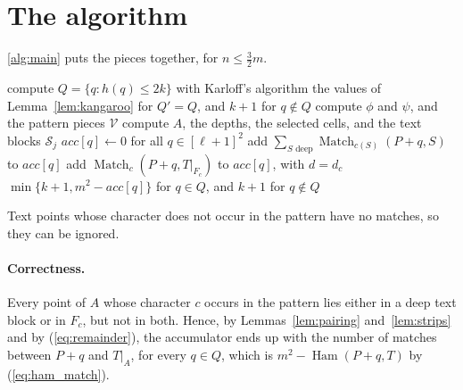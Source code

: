 \documentclass[11pt]{article}
\theoremstyle{definition}
\DeclareMathOperator{\Ham}{Ham}
\DeclareMathOperator{\Match}{Match}
\newcommand{\cS}{\mathcal{S}}
\newcommand{\cV}{\mathcal{V}}
\newcommand{\abs}[1]{\lvert #1 \rvert}
\begin{document}
\section{The algorithm}
\label{sec:algorithm}

\autoref{alg:main} puts the pieces together, for $n \le \frac32 m$.



\begin{algorithm}[ht]
  \caption{Two-dimensional pattern matching with $k$ mismatches, for $n \le \frac32 m$.}
  \label{alg:main}
  \begin{algorithmic}[1]
    \State compute $Q = \{q : h(q) \le 2k\}$ with Karloff's algorithm 
    \If{$\abs{Q} \le 32m + m^2/k$}
      \State \Return the values of Lemma~\ref{lem:kangaroo} for $Q' = Q$, and $k+1$ for $q \notin Q$
    \EndIf
    \State compute $\phi$ and $\psi$, and the pattern pieces $\cV$ 
    \State compute $A$, the depths, the selected cells, and the text blocks $\cS_j$ 
    \State $\mathit{acc}[q] \gets 0$ for all $q \in [\ell+1]^2$
    \State add $\sum_{S \text{ deep}} \Match_{c(S)}(P + q, S)$ to $\mathit{acc}[q]$ 
      \State add $\Match_c(P + q, T|_{F_c})$ to $\mathit{acc}[q]$, with $d = d_c$ 
    \EndFor
    \State \Return $\min\{k+1, m^2 - \mathit{acc}[q]\}$ for $q \in Q$, and $k+1$ for $q \notin Q$
  \end{algorithmic}
\end{algorithm}



Text points whose character does not occur in the pattern have no matches, so they can be ignored.

\paragraph{Correctness.}
Every point of $A$ whose character $c$ occurs in the pattern lies either in a deep text block or in $F_c$, but not in both.
Hence, by Lemmas~\ref{lem:pairing} and~\ref{lem:strips} and by (\ref{eq:remainder}), the accumulator ends up with the number of matches between $P + q$ and $T|_A$, for every $q \in Q$, which is $m^2 - \Ham(P+q,T)$ by (\ref{eq:ham_match}).
\end{document}
